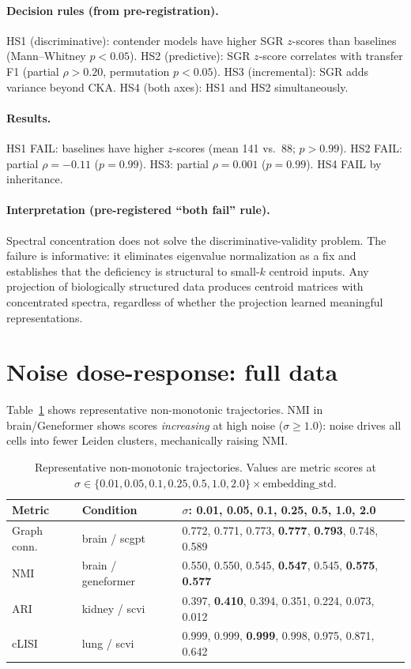 \documentclass[11pt]{article}
\begin{document}
\paragraph{Decision rules (from pre-registration).} HS1 (discriminative):
contender models have higher SGR $z$-scores than baselines (Mann--Whitney
$p < 0.05$). HS2 (predictive): SGR $z$-score correlates with transfer
F1 (partial $\rho > 0.20$, permutation $p < 0.05$). HS3 (incremental):
SGR adds variance beyond CKA. HS4 (both axes): HS1 and HS2
simultaneously.

\paragraph{Results.} HS1 FAIL: baselines have higher $z$-scores
(mean 141 vs.\ 88; $p > 0.99$). HS2 FAIL: partial $\rho = -0.11$
($p = 0.99$). HS3: partial $\rho = 0.001$ ($p = 0.99$). HS4 FAIL by
inheritance.

\paragraph{Interpretation (pre-registered ``both fail'' rule).} Spectral
concentration does not solve the discriminative-validity problem. The
failure is informative: it eliminates eigenvalue normalization as a fix
and establishes that the deficiency is structural to small-$k$ centroid
inputs. Any projection of biologically structured data produces
centroid matrices with concentrated spectra, regardless of whether the
projection learned meaningful representations.


\section{Noise dose-response: full data}
\label{app:noise}

Table~\ref{tab:app_noise_fail} shows representative non-monotonic
trajectories. NMI in brain/Geneformer shows scores \emph{increasing} at
high noise ($\sigma \geq 1.0$): noise drives all cells into fewer
Leiden clusters, mechanically raising NMI.

\begin{table}[h!]
\centering
\caption{Representative non-monotonic trajectories. Values are metric
scores at $\sigma \in \{0.01, 0.05, 0.1, 0.25, 0.5, 1.0, 2.0\} \times
\text{embedding\_std}$.}
\label{tab:app_noise_fail}
\footnotesize
\begin{tabular}{@{}llp{}@{}}
\toprule
Metric & Condition & $\sigma$: 0.01, 0.05, 0.1, 0.25, 0.5, 1.0, 2.0 \\
\midrule
Graph conn. & brain / scgpt & 0.772, 0.771, 0.773, \textbf{0.777}, \textbf{0.793}, 0.748, 0.589 \\
NMI & brain / geneformer & 0.550, 0.550, 0.545, \textbf{0.547}, 0.545, \textbf{0.575}, \textbf{0.577} \\
ARI & kidney / scvi & 0.397, \textbf{0.410}, 0.394, 0.351, 0.224, 0.073, 0.012 \\
cLISI & lung / scvi & 0.999, 0.999, \textbf{0.999}, 0.998, 0.975, 0.871, 0.642 \\
\bottomrule
\end{tabular}
\end{table}




\end{document}

